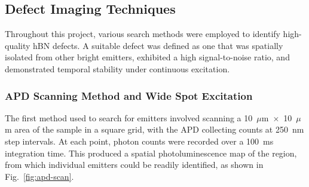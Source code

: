 \subsection{Defect Imaging Techniques}

Throughout this project, various search methods were employed to identify high-quality hBN defects. A suitable defect was defined as one that was spatially isolated from other bright emitters, exhibited a high signal-to-noise ratio, and demonstrated temporal stability under continuous excitation.

\subsubsection{APD Scanning Method and Wide Spot Excitation}

The first method used to search for emitters involved scanning a 10~$\mu$m~$\times$~10~$\mu$m area of the sample in a square grid, with the APD collecting counts at 250~nm step intervals. At each point, photon counts were recorded over a 100~ms integration time. This produced a spatial photoluminescence map of the region, from which individual emitters could be readily identified, as shown in Fig.~\ref{fig:apd-scan}.

